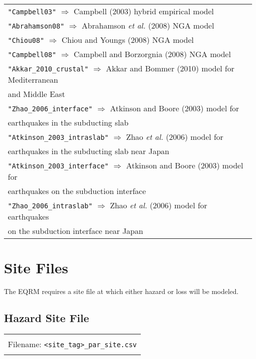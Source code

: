 \begin{tabular}{|p{\textwidth}|}
\texttt{"Campbell03"} $\Rightarrow$ Campbell (2003) hybrid empirical model\\
\texttt{"Abrahamson08"} $\Rightarrow$ Abrahamson \textit{et al.} (2008) NGA model\\
\texttt{"Chiou08"} $\Rightarrow$ Chiou and Youngs (2008) NGA model \\
\texttt{"Campbell08"} $\Rightarrow$ Campbell and Borzorgnia (2008) NGA model \\
\texttt{"Akkar\_2010\_crustal"} $\Rightarrow$ Akkar and Bommer (2010) model for Mediterranean \\
    \hspace{8em} and Middle East\\
\texttt{"Zhao\_2006\_interface"} $\Rightarrow$ Atkinson and Boore (2003) model for \\
    \hspace{8em} earthquakes in the subducting slab \\
\texttt{"Atkinson\_2003\_intraslab"} $\Rightarrow$ Zhao \textit{et al.} (2006) model for \\
    \hspace{8em} earthquakes in the subducting slab near Japan\\
\texttt{"Atkinson\_2003\_interface"} $\Rightarrow$ Atkinson and Boore (2003) model for \\
    \hspace{8em} earthquakes on the subduction interface\\
\texttt{"Zhao\_2006\_intraslab"} $\Rightarrow$ Zhao \textit{et al.} (2006) model for earthquakes \\
    \hspace{8em} on the subduction interface near Japan \\
\hline
\end{tabular}



\section{Site Files}


The EQRM requires a site file at which either hazard or loss will be modeled.

\subsection{Hazard Site File}

\begin{center}
\begin{tabular}{|c|}
\hline
\\
Filename: \texttt{<site\_tag>\_par\_site.csv} \\
\\
\hline
\end{tabular}
\end{center}

